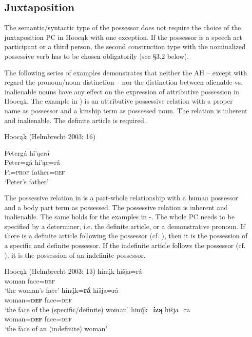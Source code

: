 \documentclass[output=paper]{LSP/langsci}
\begin{document}
\subsection{Juxtaposition}

The semantic/syntactic type of the possessor does not require the choice of the juxtaposition PC in Hoocąk with one exception. If the possessor is a speech act participant or a third person, the second construction type with the nominalized possessive verb has to be chosen obligatorily (see §3.2 below).

The following series of examples demonstrates that neither the AH – except with regard the pronoun/noun distinction – nor the distinction between alienable vs. inalienable nouns have any effect on the expression of attributive possession in Hoocąk. The example in ) is an attributive possessive relation with a proper name as possessor and a kinship term as possessed noun. The relation is inherent and inalienable. The definite article is required.

\ea Hoocąk (Helmbrecht 2003: 16) \label{petersfather}

\glll Petergá hi'\k{a}crá\\
Peter=gá       hi'\k{a}c=rá \\
  P.=\textsc{prop} father=\textsc{def} \\
\glt`Peter's father'
\z

The possessive relation in  is a part-whole relationship with a human possessor and a body part term as possessed. The possessive relation is inherent and inalienable. The same holds for the examples in -. The whole PC needs to be specified by a determiner, i.e. the definite article, or a demonstrative pronoun. If there is a definite article following the possessor (cf. ), then it is the possession of a specific and definite possessor. If the indefinite article follows the possessor (cf. ), it is the possession of an indefinite possessor. 

\ea Hoocąk (Helmbrecht 2003: 13)\label{womansface}
\ea \label{womansfacea}
\gll hinų́k    hišja=rá \\
woman face=\textsc{def} \\
\glt `the woman's face'
\ex\label{womansfaceb}
\gll hinų́́k=\textbf{rá}         hišja=rá \\
woman=\textbf{\textsc{def}} face=\textsc{def} \\
\trans `the face of the (specific/definite) woman'
\ex\label{womansfacec}
\gll hinų́́k=\textbf{íz\k{a}} hišja=ra \\
woman=\textbf{\textsc{def}}  face=\textsc{def} \\ 
\glt `the face of an (indefinite) woman'
\z
\z
\end{document}
